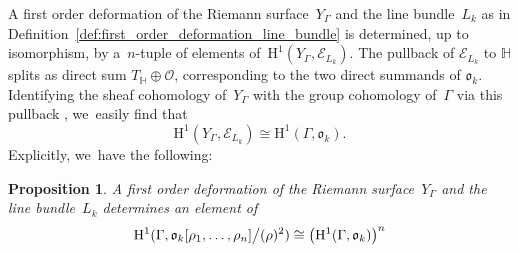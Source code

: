 \documentclass[10pt,a4paper]{article}
\numberwithin{equation}{section}
\theoremstyle{plain}
\newtheorem{proposition}[theoremcounter]{Proposition}
\theoremstyle{definition}
\newcommand{\tx}{\text}
\newcommand{\cE}{\ensuremath{\mathcal{E}}}
\newcommand{\cO}{\ensuremath{\mathcal{O}}}
\newcommand{\frako}{\ensuremath{\mathfrak{o}}}
\newcommand{\rmH}{\ensuremath{\mathrm{H}}}
\newcommand{\HS}{\ensuremath{\mathbb{H}}}
\let\Ga\Gamma
\begin{document}
A first order deformation of the Riemann surface~$Y_\Ga$ and the line bundle~$L_k$ as in Definition~\ref{def:first_order_deformation_line_bundle} is determined, up to isomorphism, by a~$n$-tuple of elements of~$\rmH^1(Y_\Ga,\cE_{L_k})$. The pullback of $\cE_{L_k}$ to $\HS$ splits as direct sum $T_{\HS}\oplus \cO$, corresponding to the two direct summands of $\frako_k$. Identifying the sheaf cohomology of~$Y_\Ga$ with the group cohomology of~$\Ga$ via this pullback \cite{eilenberg45,szamuely2009galois}, we~easily find that
\begin{equation}\label{eq:deformation-to-cocycle}
\rmH^1(Y_\Ga,\cE_{L_k}) \cong \rmH^1(\Ga,\frako_k)
\tx{.}
\end{equation}
Explicitly, we~have the following:
\begin{proposition}
A first order deformation of the Riemann surface~$Y_\Ga$ and the line bundle~$L_k$ determines an element of
\[
\rmH^1(\Ga,\frako_k[ \rho_1,\ldots,\rho_n ] \big\slash (\rho)^2)\cong\left(\rmH^1(\Ga,\frako_k)\right)^n\]
\end{proposition}
\end{document}
